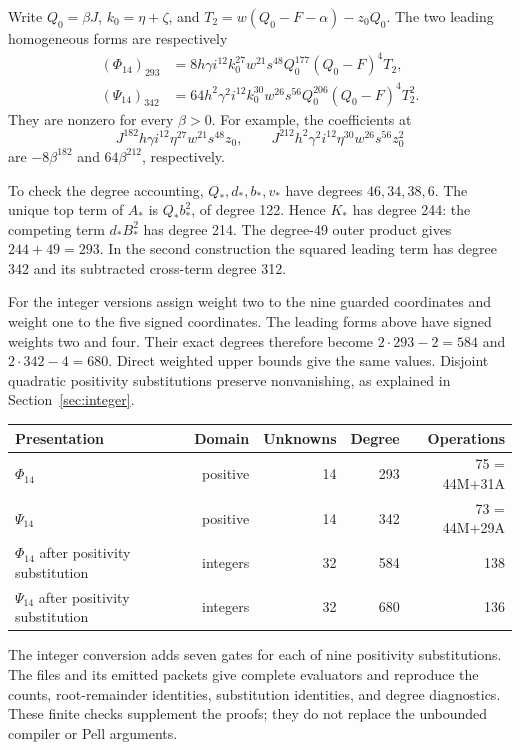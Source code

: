 Write \(Q_0=\beta J\), \(k_0=\eta+\zeta\), and
\(T_2=w(Q_0-F-\alpha)-z_0Q_0\). The two leading homogeneous
forms are respectively
\begin{align}
 (\Phi_{14})_{293}
  &=8h\gamma i^{12}k_0^{27}w^{21}s^{48}
       Q_0^{177}(Q_0-F)^4T_2,\label{eq:phi14-leader}\\
 (\Psi_{14})_{342}
  &=64h^2\gamma^2 i^{12}k_0^{30}w^{26}s^{56}
       Q_0^{206}(Q_0-F)^4T_2^2.\label{eq:psi14-leader}
\end{align}
They are nonzero for every \(\beta>0\). For example, the coefficients
at
\[
 J^{182}h\gamma i^{12}\eta^{27}w^{21}s^{48}z_0,
 \qquad
 J^{212}h^2\gamma^2i^{12}\eta^{30}w^{26}s^{56}z_0^2
\]
are \(-8\beta^{182}\) and \(64\beta^{212}\), respectively.

To check the degree accounting, \(Q_*,d_*,b_*,v_*\) have degrees
\(46,34,38,6\). The unique top term of \(A_*\) is \(Q_*b_*^2\),
of degree 122. Hence \(K_*\) has degree 244: the competing
term \(d_*B_*^2\) has degree 214. The degree-49 outer product gives
\(244+49=293\). In the second construction the squared leading
term has degree 342 and its subtracted cross-term degree 312.

For the integer versions assign weight two to the nine guarded
coordinates and weight one to the five signed coordinates. The leading
forms above have signed weights two and four. Their exact degrees
therefore become \(2\cdot293-2=584\) and
\(2\cdot342-4=680\). Direct weighted upper bounds give the same
values. Disjoint quadratic positivity substitutions preserve
nonvanishing, as explained in Section~\ref{sec:integer}.

\begin{center}\small
\begin{tabular}{@{}lrrrr@{}}
\toprule
Presentation & Domain & Unknowns & Degree & Operations\\
\midrule
\(\Phi_{14}\) & positive &14&293&75 = 44M+31A\\
\(\Psi_{14}\) & positive &14&342&73 = 44M+29A\\
\(\Phi_{14}\) after positivity substitution & integers &32&584&138\\
\(\Psi_{14}\) after positivity substitution & integers &32&680&136\\
\bottomrule
\end{tabular}
\end{center}
The integer conversion adds seven gates for each of nine positivity
substitutions. The files  and its
emitted packets give complete evaluators and reproduce the counts,
root-remainder identities, substitution identities, and degree
diagnostics. These finite checks supplement the proofs; they do not
replace the unbounded compiler or Pell arguments.
